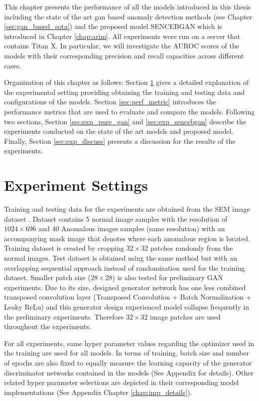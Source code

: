 
\begingroup


This chapter presents the performance of all the models introduced in this thesis including the
state of the art gan based anomaly detection methods (see Chapter \ref{sec:gan_based_sota}) and the
proposed model SENCEBGAN which is introduced in Chapter \ref{chap:arim}. All experiments were run on
a server that contains Titan X. In particular, we will investigate the AUROC scores of the models
with their corresponding precision and recall capacities across different cases. 

Organization of this chapter as follows: Section \ref{sec:exp_settings} gives a detailed explanation
of the experimental setting providing obtaining the training and testing data and configurations of
the models. Section \ref{sec:perf_metric} introduces the performance metrics that are used to
evaluate and compare the models. Following two sections, Section \ref{sec:exp_pure_gan} and
\ref{sec:exp_sencebgan} describe the experiments conducted on the state of the art models and
proposed model. Finally, Section \ref{sec:exp_discuss} presents a discussion for the results of the
experiments.

\section{Experiment Settings}
\label{sec:exp_settings}
Training and testing data for the experiments are obtained from the SEM image dataset \cite{sem}.
Dataset contains 5 normal image samples with the resolution of $1024 \times 696$ and 40 Anomalous
images samples (same resolution) with an accompanying mask image that denotes where each anomalous
region is located. Training dataset is created by cropping $32 \times 32$ patches randomly from the
normal images. Test dataset is obtained using the same method but with an overlapping sequential
approach instead of randomization used for the training dataset. Smaller patch size ($28 \times 28$)
is also tested for preliminary GAN experiments. Due to its size, designed generator network has one
less combined transposed convolution layer (Transposed Convolution + Batch Normalization + Leaky
ReLu) and this generator design experienced model collapse frequently in the preliminary
experiments. Therefore $32 \times 32$ image patches are used throughout the experiments.
 
For all experiments, same hyper parameter values regarding the optimizer used in the training are
used for all models. In terms of training, batch size and number of epochs are also fixed to equally
measure the learning capacity of the generator discriminator networks contained in the models (See
Appendix for details). Other related hyper parameter selections are depicted in their corresponding
model implementations (See Appendix Chapter \ref{chap:imp_details}).

